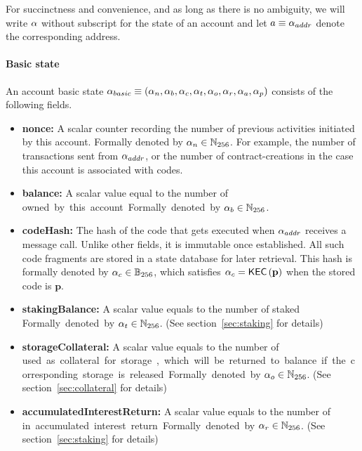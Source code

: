 For succinctness and convenience, and as long as there is no ambiguity, we will write $\mathbf{\alpha}$ without subscript for the state of an account and let $a\equiv \mathbf{\alpha}_{addr}$ denote the corresponding address.

\paragraph{Basic state}

An account basic state $\mathbf{\alpha}_{basic} \equiv\left( \mathbf{\alpha}_n, \mathbf{\alpha}_b, \mathbf{\alpha}_c,\mathbf{\alpha}_t, \mathbf{\alpha}_o, \mathbf{\alpha}_r, \mathbf{\alpha}_a, \mathbf{\alpha}_p\right)$ consists of the following fields. 
\begin{itemize}[nosep]
	\item {\bf nonce:} A scalar counter recording the number of previous activities initiated by this account. Formally denoted by $\mathbf{\alpha}_n\in \mathbb{N}_{256}$. For example, the number of transactions sent from $\mathbf{\alpha}_{addr}$, or the number of contract-creations in the case this account is associated with codes.

	\item {\bf balance:} A scalar value equal to the number of \unit  owned by this account. Formally denoted by $\mathbf{\alpha}_b\in \mathbb{N}_{256}$. 

	\item {\bf codeHash:} The hash of the \cvm code that gets executed when $\mathbf{\alpha}_{addr}$ receives a message call. 
	Unlike other fields, it is immutable once established. All such code fragments are stored in a state database for later retrieval. This hash is formally denoted by $\mathbf{\alpha}_c\in \mathbb{B}_{256}$,
	which satisfies $\mathbf{\alpha}_c=\mathsf{KEC}\left(\mathbf{p} \right)$ when the stored code is $\mathbf{p}$.  

	\item {\bf stakingBalance:} A scalar value equals to the number of staked \unit. Formally denoted by $\mathbf{\alpha}_t\in \mathbb{N}_{256}$. (See section~\ref{sec:staking} for details)
	
	\item {\bf storageCollateral:} A scalar value equals to the number of \unit used as collateral for storage, which will be returned to balance if the corresponding storage is released. Formally denoted by $\mathbf{\alpha}_o\in \mathbb{N}_{256}$. (See section~\ref{sec:collateral} for details)
	
	\item {\bf accumulatedInterestReturn:} A scalar value equals to the number of \unit in accumulated interest return. Formally denoted by $\mathbf{\alpha}_r\in \mathbb{N}_{256}$. (See section~\ref{sec:staking} for details)
	

\end{itemize}
